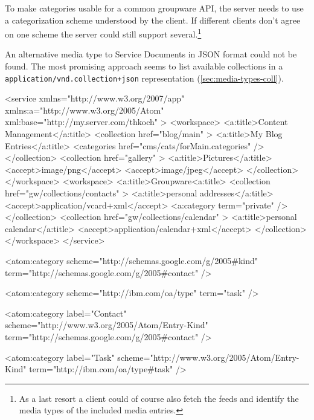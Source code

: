 \documentclass[11pt,a4paper,headsepline,twoside]{scrartcl}		%
\begin{document}
To make categories usable for a common groupware API, the server needs to use a
categorization scheme understood by the client. If different clients don't agree
on one scheme the server could still support several.\footnote{As a last resort
  a client could of course also fetch the feeds and identify the media types of
  the included media entries.}

An alternative media type to Service Documents in JSON format could not be
found. The most promising approach seems to list available collections in a
\lstinline:application/vnd.collection+json: representation
(\autoref{sec:media-types-coll}).

\begin{anylisting}[language=xml,
                   label=fig:atomservicedoc,
                   caption={An Atom Service Document linking to groupware collections}]
<service xmlns="http://www.w3.org/2007/app"
         xmlns:a="http://www.w3.org/2005/Atom"
         xml:base="http://my.server.com/thkoch" >
 <workspace>
  <a:title>Content Management</a:title>
  <collection href="blog/main" >
   <a:title>My Blog Entries</a:title>
   <categories href="cms/cats/forMain.categories" />
  </collection>
  <collection href="gallery" >
   <a:title>Pictures</a:title>
   <accept>image/png</accept> <accept>image/jpeg</accept>
  </collection>
 </workspace>
 <workspace>
  <a:title>Groupware<a:title>
   <collection href="gw/collections/contacts" >
    <a:title>personal addresses</a:title>
    <accept>application/vcard+xml</accept>
    <a:category term="private" />
  </collection>
   <collection href="gw/collections/calendar" >
    <a:title>personal calendar</a:title>
    <accept>application/calendar+xml</accept>
  </collection>
 </workspace>
</service>
\end{anylisting}


\begin{anylisting}[label=fig:atom-category,
                   language=xml,
                   caption={ATOM categories as used by Google and IBM to mark entry
                            types and a proposal to use a standard scheme URI for type terms}]
<atom:category
    scheme="http://schemas.google.com/g/2005#kind"
    term="http://schemas.google.com/g/2005#contact" />

<atom:category 
    scheme="http://ibm.com/oa/type"
    term="task" />

<atom:category  label="Contact"
    scheme="http://www.w3.org/2005/Atom/Entry-Kind"
    term="http://schemas.google.com/g/2005#contact" />

<atom:category  label="Task"
     scheme="http://www.w3.org/2005/Atom/Entry-Kind"
     term="http://ibm.com/oa/type#task" />
\end{anylisting}
\end{document}
